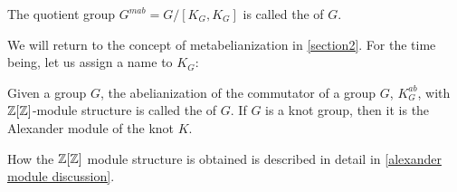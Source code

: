 \begin{definition}[metabelianization]\label{def:metabelianization}
  The quotient group $G^{mab}=G/[K_G, K_G]$ is called the  of $G$. 
\end{definition}

We will return to the concept of metabelianization in \cref{section2}. For the time being, let us assign a name to $K_G$:

\begin{definition}\label{alexander module def}
  Given a group $G$, the abelianization of the commutator of a group $G$, $K_G^{ab}$, with $\operatorname{\mathbb{Z}}[\operatorname{\mathbb{Z}}]$-module structure is called the  of $G$. If $G$ is a knot group, then it is the Alexander module of the knot $K$.
\end{definition}

How the $\operatorname{\mathbb{Z}}[\operatorname{\mathbb{Z}}]$ module structure is obtained is described in detail in \cref{alexander module discussion}.




